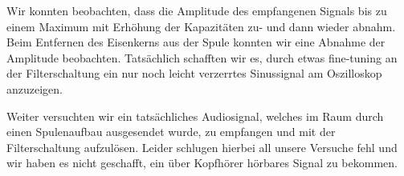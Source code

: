 Wir konnten beobachten, dass die Amplitude des empfangenen Signals bis zu einem Maximum mit Erhöhung der Kapazitäten zu- und dann wieder abnahm. Beim Entfernen des Eisenkerns aus der Spule konnten wir eine Abnahme der Amplitude beobachten. Tatsächlich schafften wir es, durch etwas fine-tuning an der Filterschaltung ein nur noch leicht verzerrtes Sinussignal am Oszilloskop anzuzeigen.

Weiter versuchten wir ein tatsächliches Audiosignal, welches im Raum durch einen Spulenaufbau ausgesendet wurde, zu empfangen und mit der Filterschaltung aufzulösen. Leider schlugen hierbei all unsere Versuche fehl und wir haben es nicht geschafft, ein über Kopfhörer hörbares Signal zu bekommen.